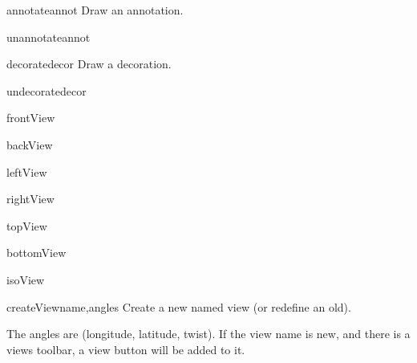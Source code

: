 \begin{funcdesc}{annotate}{annot}
Draw an annotation.

\end{funcdesc}


\begin{funcdesc}{unannotate}{annot}


\end{funcdesc}


\begin{funcdesc}{decorate}{decor}
Draw a decoration.

\end{funcdesc}


\begin{funcdesc}{undecorate}{decor}


\end{funcdesc}


\begin{funcdesc}{frontView}{}


\end{funcdesc}


\begin{funcdesc}{backView}{}


\end{funcdesc}


\begin{funcdesc}{leftView}{}


\end{funcdesc}


\begin{funcdesc}{rightView}{}


\end{funcdesc}


\begin{funcdesc}{topView}{}


\end{funcdesc}


\begin{funcdesc}{bottomView}{}


\end{funcdesc}


\begin{funcdesc}{isoView}{}


\end{funcdesc}


\begin{funcdesc}{createView}{name,angles}
Create a new named view (or redefine an old).

    The angles are (longitude, latitude, twist).
    If the view name is new, and there is a views toolbar,
    a view button will be added to it.
    

\end{funcdesc}


